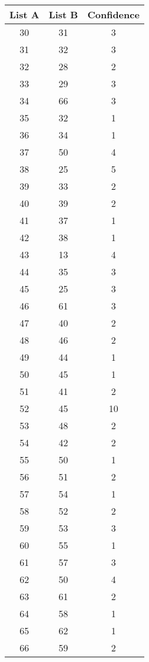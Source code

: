 \newpage

\begin{table}
\begin{center}
\begin{tabular}{c c c} \hline
List A  & List B & Confidence \\ \hline
      30 &     31   &    3    \\
      31 &     32   &    3    \\
      32 &     28   &    2   \\
      33 &     29   &    3   \\
      34 &     66   &    3   \\
      35 &     32   &    1   \\
      36 &     34   &    1    \\
      37 &     50   &    4    \\
      38 &     25   &    5    \\
      39 &     33   &    2   \\
      40 &     39   &    2   \\ 
      41 &     37  &     1  \\
      42 &     38  &     1   \\
      43 &     13  &     4   \\
      44 &     35  &     3   \\
      45 &     25  &     3  \\
      46 &     61  &     3   \\
      47 &     40  &     2 \\
      48 &     46  &     2  \\
      49 &     44  &     1   \\
      50 &     45  &     1 \\
      51 &     41  &     2  \\
      52 &     45  &    10   \\
      53 &     48  &     2   \\
      54 &     42  &     2   \\
      55 &     50  &     1  \\
      56 &     51  &     2   \\
      57 &     54  &     1   \\
      58 &     52  &     2   \\
      59 &     53  &     3  \\
      60 &     55  &     1  \\
      61 &     57  &     3  \\
      62 &     50  &     4   \\
      63 &     61  &     2   \\
      64 &     58  &     1  \\
      65 &     62  &     1   \\
      66 &     59  &     2   \\ \hline \hline
\end{tabular}


\end{center}
\end{table}
